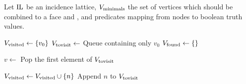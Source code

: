 \begin{algorithm}[tbp]
    Let $\operatorname{IL}$ be an incidence lattice, $V_{\textnormal{minimals}}$ the set of vertices which should be combined to a face and ,  and  predicates mapping from nodes to boolean truth values.
    \begin{algorithmic}[1]
            \State $V_{\textnormal{visited}} \gets \left\{ v_0 \right\}$
            \State $V_{\textnormal{tovisit}} \gets$ Queue containing only $v_0$
            \State $V_{\textnormal{found}} \gets \left\{  \right\}$

                \State $v \gets$ Pop the first element of $V_{\textnormal{tovisit}}$

                            \State $V_{\textnormal{visited}} \gets V_{\textnormal{visited}} \cup \left\{ n \right\}$
                            \State Append $n$ to $V_{\textnormal{tovisit}}$
                        \EndIf
                    \EndFor
                \EndIf


\end{algorithmic}
\end{algorithm}
